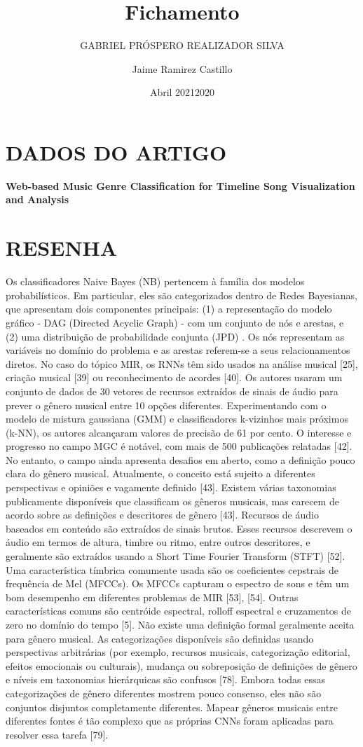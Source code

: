 \documentclass{article}
\title{Fichamento}
\author{GABRIEL PRÓSPERO REALIZADOR  SILVA}
\date{Abril 2021}
\begin{document}
\maketitle

\section{DADOS DO ARTIGO}
\textbf{Web-based Music Genre Classification for Timeline Song Visualization and Analysis \\}
\author{Jaime Ramirez Castillo \\}
\date{2020}

\section{RESENHA}
Os classificadores Naive Bayes (NB) pertencem à família dos modelos probabilísticos. Em particular, eles são categorizados dentro de Redes Bayesianas, que apresentam dois componentes principais: (1) a representação do modelo gráfico - DAG (Directed Acyclic Graph) - com um conjunto de nós e arestas, e (2) uma distribuição de probabilidade conjunta (JPD) . Os nós representam as variáveis no domínio do problema e as arestas referem-se a seus relacionamentos diretos.
No caso do tópico MIR, os RNNs têm sido usados ​​na análise musical [25], criação musical [39] ou reconhecimento de acordes [40].
Os autores usaram um conjunto de dados de 30 vetores de recursos extraídos de sinais de áudio para prever o gênero musical entre 10 opções diferentes. Experimentando com o modelo de mistura gaussiana (GMM) e classificadores k-vizinhos mais próximos (k-NN), os autores alcançaram valores de precisão de 61 por cento.
O interesse e progresso no campo MGC é notável, com mais de 500 publicações relatadas [42]. No entanto, o campo ainda apresenta desafios em aberto, como a definição pouco clara do gênero musical. Atualmente, o conceito está sujeito a diferentes perspectivas e opiniões e vagamente definido [43]. Existem várias taxonomias publicamente disponíveis que classificam os gêneros musicais, mas carecem de acordo sobre as definições e descritores de gênero [43].
Recursos de áudio baseados em conteúdo são extraídos de sinais brutos. Esses recursos descrevem o áudio em termos de altura, timbre ou ritmo, entre outros descritores, e geralmente são extraídos usando a Short Time Fourier Transform (STFT) [52].
Uma característica tímbrica comumente usada são os coeficientes cepstrais de frequência de Mel (MFCCs). Os MFCCs capturam o espectro de sons e têm um bom desempenho em diferentes problemas de MIR [53], [54]. Outras características comuns são centróide espectral, rolloff espectral e cruzamentos de zero no domínio do tempo [5].
Não existe uma definição formal geralmente aceita para gênero musical. As categorizações disponíveis são definidas usando perspectivas arbitrárias (por exemplo, recursos musicais, categorização editorial, efeitos emocionais ou culturais), mudança ou sobreposição de definições de gênero e níveis em taxonomias hierárquicas são confusos [78]. Embora todas essas categorizações de gênero diferentes mostrem pouco consenso, eles não são conjuntos disjuntos completamente diferentes. Mapear gêneros musicais entre diferentes fontes é tão complexo que as próprias CNNs foram aplicadas para resolver essa tarefa [79].
\end{document}
